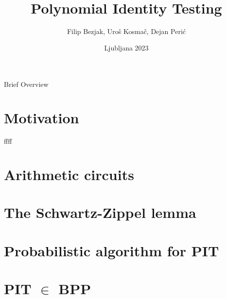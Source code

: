 \documentclass{beamer}
\title{Polynomial Identity Testing}
\author{Filip Bezjak, Uroš Kosmač, Dejan Perić}
\date{Ljubljana 2023}
\begin{document}
\begin{frame}
	\maketitle
\end{frame}


 \begin{frame}{Brief Overview}
	\tableofcontents
\end{frame}

\section{Motivation}
ffff


\section{Arithmetic circuits}





\section{The Schwartz-Zippel lemma}



\section{Probabilistic algorithm for PIT}


\section{PIT $\in$ BPP}



\end{document}
